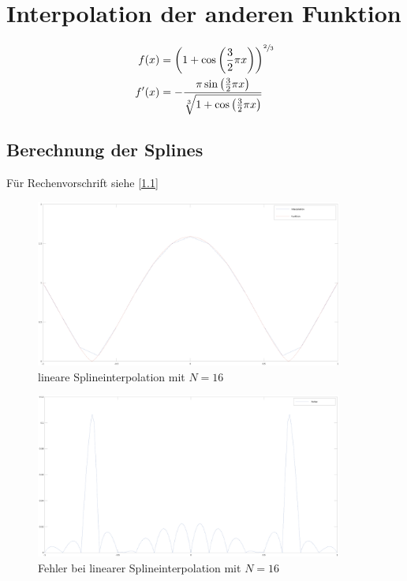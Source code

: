 \documentclass[ngerman,a4paper]{texmf/tex/latex/mathscript/mathscript}
\begin{document}
\section{Interpolation der anderen Funktion}
	\begin{align}
		f(x) &= \left( 1+\cos\left(\frac{3}{2}\pi x \right) \right)^{\sfrac{2}{3}}\notag \\
		f'(x) &=-\frac{\pi\sin\left(\frac{3}{2}\pi x\right)}{\sqrt[3]{1+\cos\left(\frac{3}{2}\pi x \right)}}\notag
	\end{align}
	
	\subsection{Berechnung der Splines}
	Für Rechenvorschrift siehe \ref{1.1}
	
	\begin{figure}[h]
		\centering
		\includegraphics[width=0.9\textwidth]{images/f_lineare_Interpolation.png}
		\caption{lineare Splineinterpolation mit $N=16$}
	\end{figure}
	
	\begin{figure}[h]
		\centering
		\includegraphics[width=0.9\textwidth]{images/f_lineare_Interpolation_Fehler.png}
		\caption{Fehler bei linearer Splineinterpolation mit $N=16$}
	\end{figure}
\end{document}
